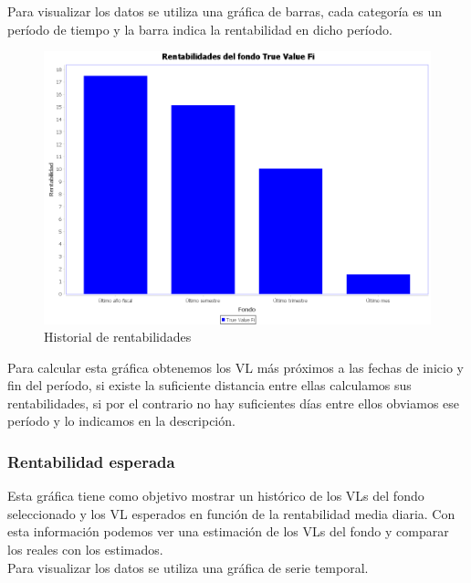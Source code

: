 \documentclass[12pt, a4paper]{book}
\begin{document}
Para visualizar los datos se utiliza una gráfica de barras, cada categoría es un período de tiempo y la barra indica la rentabilidad en dicho período.

	\begin{figure}[htbp]
	\centering
	\includegraphics[width=\textwidth]{figuras/rentabilidades.PNG}
	\caption{Historial de rentabilidades}
	\label{fig:rentabilidades}
	\end {figure}

Para calcular esta gráfica obtenemos los \gls{VL} más próximos a las fechas de inicio y fin del período, si existe la suficiente distancia entre ellas calculamos sus rentabilidades, si por el contrario no hay suficientes días entre ellos obviamos ese período y lo indicamos en la descripción.

\newpage

\subsubsection{Rentabilidad esperada}

Esta gráfica tiene como objetivo mostrar un histórico de los \gls{VL}s del fondo seleccionado y los \gls{VL} esperados en función de la rentabilidad media diaria. Con esta información podemos ver una estimación de los \gls{VL}s del fondo y comparar los reales con los estimados.\\

Para visualizar los datos se utiliza una gráfica de serie temporal.
\end{document}
